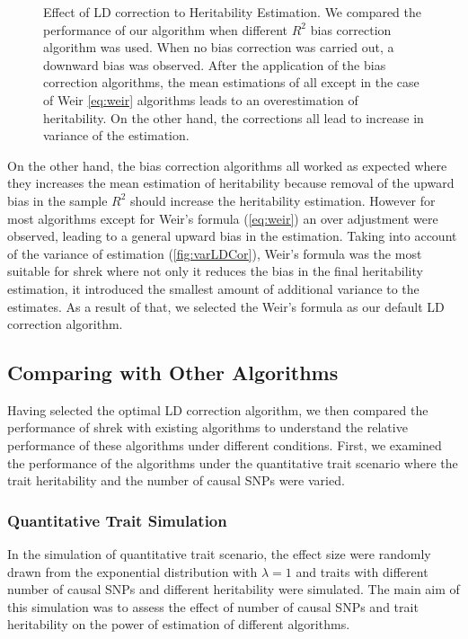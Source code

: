 \documentclass[12pt]{scrbook}
\begin{document}
\begin{figure}
{		\label{fig:varLDCor}
	}
	\caption[Effect of LD correction to Heritability Estimation]
	{Effect of LD correction to Heritability Estimation.
		We compared the performance of our algorithm when different $R^2$ bias correction algorithm was used.
		When no bias correction was carried out, a downward bias was observed. 
		After the application of the bias correction algorithms, the mean estimations of all except in the case of Weir \cref{eq:weir} algorithms leads to an overestimation of heritability.
		On the other hand, the corrections all lead to increase in variance of the estimation.
	} 
	\label{fig:ldCorCom}
\end{figure}
On the other hand, the bias correction algorithms all worked as expected where they increases the mean estimation of heritability because removal of the upward bias in the sample $R^2$ should increase the heritability estimation.
However for most algorithms except for Weir's formula (\cref{eq:weir}) an over adjustment were observed, leading to a general upward bias in the estimation.
Taking into account of the variance of estimation (\cref{fig:varLDCor}), Weir's formula was the most suitable for \gls{shrek} where not only it reduces the bias in the final heritability estimation, it introduced the smallest amount of additional variance to the estimates.
As a result of that, we selected the Weir's formula as our default \gls{LD} correction algorithm.

\subsection{Comparing with Other Algorithms}
Having selected the optimal \gls{LD} correction algorithm, we then compared the performance of \gls{shrek} with existing algorithms to understand the relative performance of these algorithms under different conditions.
First, we examined the performance of the algorithms under the quantitative trait scenario where the trait heritability and the number of causal \glspl{SNP} were varied.

\subsubsection{Quantitative Trait Simulation}
 
In the simulation of quantitative trait scenario, the effect size were randomly drawn from the exponential distribution with $\lambda=1$ and traits with different number of causal \glspl{SNP} and different heritability were simulated.
The main aim of this simulation was to assess the effect of number of causal \glspl{SNP} and trait heritability on the power of estimation of different algorithms.
\end{document}
